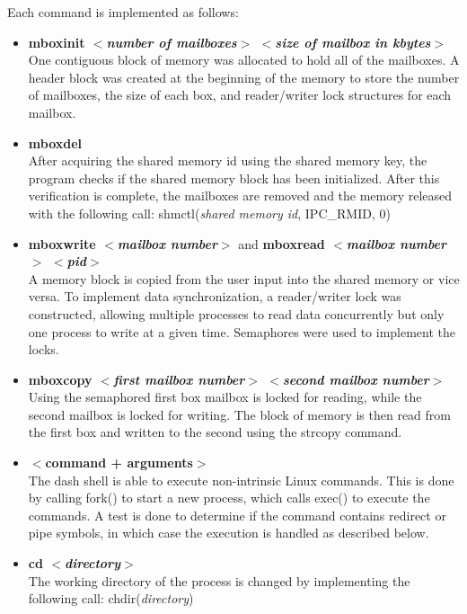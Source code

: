 \documentclass{article}
\begin{document}
Each command is implemented as follows:\\
\begin{itemize}
\item \textbf{mboxinit $<$\textit{number of mailboxes}$>$ $<$\textit{size of mailbox in kbytes}$>$}\\
One contiguous block of memory was allocated to hold all of the mailboxes. A header block was created at the beginning of the memory to store the number of mailboxes, the size of each box, and reader/writer lock structures for each mailbox.\\

\item \textbf{mboxdel}\\
After acquiring the shared memory id using the shared memory key, the program checks if the shared memory block has been initialized. After this verification is complete, the mailboxes are removed and the memory released with the following call: shmctl(\textit{shared memory id}, IPC\_RMID, 0)

\item \textbf{mboxwrite $<$\textit{mailbox number}$>$} and \textbf{mboxread $<$\textit{mailbox number}$>$ $<$\textit{pid}$>$}\\
A memory block is copied from the user input into the shared memory or vice versa.  To implement data synchronization, a reader/writer lock was constructed, allowing multiple processes to read data concurrently but only one process to write at a given time. Semaphores were used to implement the locks.
\item \textbf{mboxcopy $<$\textit{first mailbox number}$>$ $<$\textit{second mailbox number}$>$}\\
Using the semaphored first box mailbox is locked for reading, while the second mailbox is locked for writing. The block of memory is then read from the first box and written to the second using the strcopy command.

\item \textbf{$<$command + arguments$>$}\\
The dash shell is able to execute non-intrinsic Linux commands.  This is done by calling fork() to start a new process, which calls exec() to execute the commands. A test is done to determine if the command contains redirect or pipe symbols, in which case the execution is handled as described below.

\item \textbf{cd $<$\textit{directory}$>$}\\
The working directory of the process is changed by implementing the following call: chdir(\textit{directory})


\end{itemize}
\end{document}
